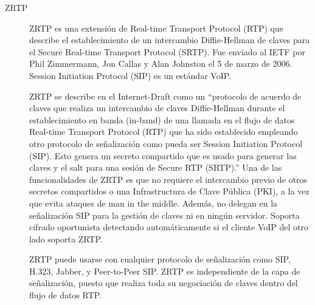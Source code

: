 \begin{description}
\item[ZRTP]
ZRTP es una extensión de Real-time Transport Protocol (RTP) que describe el establecimiento de un intercambio Diffie-Hellman de claves para el Secure Real-time Transport Protocol (SRTP). Fue enviado al IETF por Phil Zimmermann, Jon Callas y Alan Johnston el 5 de marzo de 2006. Session Initiation Protocol (SIP) es un estándar VoIP.

ZRTP se describe en el Internet-Draft  como un ``protocolo de acuerdo de claves que realiza un intercambio de claves Diffie-Hellman durante el establecimiento en banda (in-band) de una llamada en el flujo de datos Real-time Transport Protocol (RTP) que ha sido establecido empleando otro protocolo de señalización como pueda ser Session Initiation Protocol (SIP). Esto genera un secreto compartido que es usado para generar las claves y el salt para una sesión de Secure RTP (SRTP).'' Una de las funcionalidades de ZRTP es que no requiere el intercambio previo de otros secretos compartidos o una Infrastructura de Clave Pública (PKI), a la vez que evita ataques de man in the middle. Además, no delegan en la señalización SIP para la gestión de claves ni en ningún servidor. Soporta cifrado oportunista detectando automáticamente si el cliente VoIP del otro lado soporta ZRTP.

ZRTP puede usarse con cualquier protocolo de señalización como SIP, H.323, Jabber, y Peer-to-Peer SIP. ZRTP es independiente de la capa de señalización, puesto que realiza toda su negociación de claves dentro del flujo de datos RTP.

\end{description}
